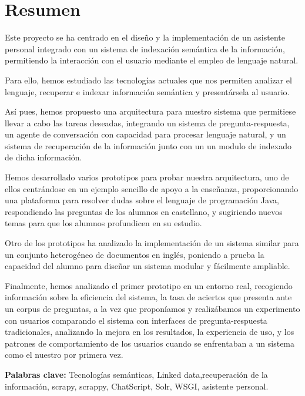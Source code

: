 \cleardoublepage
{}
\chapter*{Resumen}

Este proyecto se ha centrado en el diseño y la implementación de un asistente personal integrado con un sistema de indexación semántica de la información, permitiendo la interacción con el usuario mediante el empleo de lenguaje natural.

Para ello, hemos estudiado las tecnologías actuales que nos permiten analizar el lenguaje, recuperar e indexar información semántica y presentársela al usuario.

Así pues, hemos propuesto una arquitectura para nuestro sistema que permitiese llevar a cabo las tareas deseadas, integrando un sistema de pregunta-respuesta, un agente de conversación con capacidad para procesar lenguaje natural, y un sistema de recuperación de la información junto con un un modulo de indexado de dicha información.

Hemos desarrollado varios prototipos para probar nuestra arquitectura, uno de ellos centrándose en un ejemplo sencillo de apoyo a la enseñanza, proporcionando una plataforma para resolver dudas sobre el lenguaje de programación Java, respondiendo las preguntas de los alumnos en castellano, y sugiriendo nuevos temas para que los alumnos profundicen en su estudio.

Otro de los prototipos ha analizado la implementación de un sistema similar para un conjunto heterogéneo de documentos en inglés, poniendo a prueba la capacidad del alumno para diseñar un sistema modular y fácilmente ampliable.

Finalmente, hemos analizado el primer prototipo en un entorno real, recogiendo información sobre la eficiencia del sistema, la tasa de aciertos que presenta ante un corpus de preguntas, a la vez que proponíamos y realizábamos un experimento con usuarios comparando el sistema con interfaces de pregunta-respuesta tradicionales, analizando la mejora en los resultados, la experiencia de uso, y los patrones de comportamiento de los usuarios cuando se enfrentaban a un sistema como el nuestro por primera vez.

\vfill
\textbf{Palabras clave:} Tecnologías semánticas, Linked data,recuperación de la información, scrapy, scrappy, ChatScript, Solr, WSGI, asistente personal.